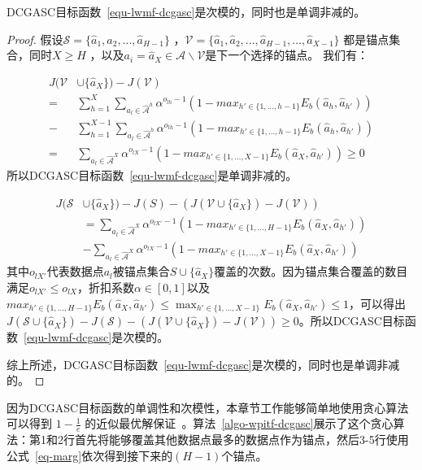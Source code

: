 \begin{theorem}
	\label{theorem:submodular}
	DCGASC目标函数~\ref{equ-lwmf-dcgasc}是次模的，同时也是单调非减的。
\end{theorem}

\begin{proof}
假设$\mathcal{S}=\{\hat{a}_1,\hat{a}_2,...,\hat{a}_{H-1}\}$ ，$\mathcal{V}=\{\hat{a}_1,\hat{a}_2,...,\hat{a}_{H-1},..., \hat{a}_{X-1}\}$ 都是锚点集合，同时$X\geq H$ ，以及$a_i = {\hat{a}_X} \in \mathcal{A} \backslash \mathcal{V}$是下一个选择的锚点。 我们有：

\begin{align}
J(\mathcal{V}&\cup \{\hat{a}_X\})-J(\mathcal{V}) \nonumber \\
= &\sum_{h=1}^{X}\sum_{a_l \in \hat{\mathcal{A}}^{h}}\alpha^{o_{lh}-1}(1-max_{h'\in\{1,...,h-1\}} E_b(\hat{a}_{h}, \hat{a}_{h'})) \nonumber \\
- &\sum_{h=1}^{X-1}\sum_{a_l \in \hat{\mathcal{A}}^{h}}\alpha^{o_{lh}-1}(1-max_{h'\in\{1,...,h-1\}} E_b(\hat{a}_{h}, \hat{a}_{h'})) \nonumber \\
= &\sum_{a_l \in \mathcal{\hat{A}}^X}\alpha^{o_{lX}-1}(1-max_{h'\in\{1,...,X-1\}} E_b(\hat{a}_X, \hat{a}_{h'}))\geq 0
\end{align}
所以DCGASC目标函数~\ref{equ-lwmf-dcgasc}是单调非减的。

\begin{align}
\label{eq-marg}
J(\mathcal{S}&\cup \{\hat{a}_X\})-J(S)-(J(\mathcal{V}\cup \{\hat{a}_X\})-J(\mathcal{V}))\nonumber\\
&=\sum_{a_l \in \mathcal{\hat{A}}^X}\alpha^{o_{lX'}-1}(1-max_{h'\in\{1,...,H-1\}} E_b(\hat{a}_X, \hat{a}_{h'}))\nonumber\\
&-\sum_{a_l \in \mathcal{\hat{A}}^X}\alpha^{o_{lX}-1}(1-max_{h'\in\{1,...,X-1\}} E_b(\hat{a}_X, \hat{a}_{h'}))
\end{align}
其中$o_{lX'}$代表数据点$a_l$被锚点集合$S\cup \{\hat{a}_X\}$覆盖的次数。因为锚点集合覆盖的数目满足$o_{lX'}\leqslant o_{lX}$，折扣系数$\alpha\in [0,1]$以及$max_{h'\in\{1,...,H-1\}} E_b(\hat{a}_{X},\hat{a}_{h'})\leq \max_{h'\in\{1,...,X-1\}} E_b(\hat{a}_{X},\hat{a}_{h'})\leq 1$，可以得出$J(\mathcal{S}\cup \{\hat{a}_X\})-J(\mathcal{S})-(J(\mathcal{V}\cup \{\hat{a}_X\})-J(\mathcal{V}))\geq0$。所以DCGASC目标函数~\ref{equ-lwmf-dcgasc}是次模的。

综上所述，DCGASC目标函数~\ref{equ-lwmf-dcgasc}是次模的，同时也是单调非减的。
\end{proof}

因为DCGASC目标函数的单调性和次模性，本章节工作能够简单地使用贪心算法可以得到 $1-\frac{1}{e}$ 的近似最优解保证~\cite{nemhauser1978analysis}。算法~\ref{algo-wpitf-dcgasc}展示了这个贪心算法：第1和2行首先将能够覆盖其他数据点最多的数据点作为锚点，然后3-5行使用公式~\ref{eq-marg}依次得到接下来的$(H-1)$个锚点。

